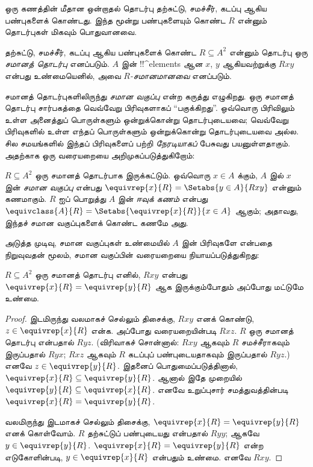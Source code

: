 \documentclass[../../../include/open-logic-section]{subfiles}
\begin{document}


ஒரு கணத்தின் மீதான ஒன்றாதல் தொடர்பு தற்சுட்டு, சமச்சீர், கடப்பு
ஆகிய பண்புகளைக் கொண்டது. இந்த மூன்று பண்புகளையும் கொண்ட
$R$ என்னும் தொடர்புகள் மிகவும் பொதுவானவை.

\begin{defn}[சமானத் தொடர்பு]
தற்சுட்டு, சமச்சீர், கடப்பு ஆகிய பண்புகளைக் கொண்ட
$R \subseteq A^2$ என்னும் தொடர்பு ஒரு \emph{சமானத் தொடர்பு} எனப்படும்.
$A$ இன் !!^{element}s ஆன $x$, $y$ ஆகியவற்றுக்கு $Rxy$
என்பது உண்மையெனில், அவை \emph{$R$-சமானமானவை} எனப்படும்.
\end{defn}

சமானத் தொடர்புகளிலிருந்து \emph{சமான வகுப்பு} என்ற கருத்து எழுகிறது.
ஒரு சமானத் தொடர்பு சார்பகத்தை வெவ்வேறு பிரிவுகளாகப் ``பகுக்கிறது''.
ஒவ்வொரு பிரிவிலும் உள்ள அனைத்துப் பொருள்களும் ஒன்றுக்கொன்று தொடர்புடையவை;
வெவ்வேறு பிரிவுகளில் உள்ள எந்தப் பொருள்களும் ஒன்றுக்கொன்று தொடர்புடையவை அல்ல.
சில சமயங்களில் இந்தப் பிரிவுகளைப் பற்றி \emph{நேரடியாகப்} பேசுவது பயனுள்ளதாகும்.
அதற்காக ஒரு வரையறையை அறிமுகப்படுத்துகிறோம்:

\begin{defn}
$R \subseteq A^2$ ஒரு சமானத் தொடர்பாக இருக்கட்டும்.
ஒவ்வொரு $x \in A$ க்கும், $A$ இல் $x$ இன் \emph{சமான வகுப்பு} என்பது
$\equivrep{x}{R} = \Setabs{y \in A}{Rxy}$ என்னும் கணமாகும்.
$R$ ஐப் பொறுத்து $A$ இன் \emph{ஈவுக் கணம்} என்பது
$\equivclass{A}{R} = \Setabs{\equivrep{x}{R}}{x \in A}$ ஆகும்;
அதாவது, இந்தச் சமான வகுப்புகளைக் கொண்ட கணமே அது.
\end{defn}

அடுத்த முடிவு, சமான வகுப்புகள் உண்மையில் $A$ இன் பிரிவுகளே என்பதை
நிறுவுவதன் மூலம், சமான வகுப்பின் வரையறையை நியாயப்படுத்துகிறது:

\begin{prop}
$R \subseteq A^2$ ஒரு சமானத் தொடர்பு எனில், $Rxy$ என்பது
$\equivrep{x}{R} = \equivrep{y}{R}$ ஆக இருக்கும்போதும்
அப்போது மட்டுமே உண்மை.
\end{prop}

\begin{proof}
இடமிருந்து வலமாகச் செல்லும் திசைக்கு, $Rxy$ எனக் கொண்டு,
$z \in \equivrep{x}{R}$ என்க. அப்போது வரையறையின்படி $Rxz$.
$R$ ஒரு சமானத் தொடர்பு என்பதால் $Ryz$.
(விரிவாகச் சொன்னால்: $Rxy$ ஆகவும் $R$ சமச்சீராகவும் இருப்பதால் $Ryx$;
$Rxz$ ஆகவும் $R$ கடப்புப் பண்புடையதாகவும் இருப்பதால் $Ryz$.)
எனவே $z \in \equivrep{y}{R}$. இதனைப் பொதுமைப்படுத்தினால்,
$\equivrep{x}{R} \subseteq \equivrep{y}{R}$.
ஆனால் இதே முறையில் $\equivrep{y}{R} \subseteq \equivrep{x}{R}$.
எனவே உறுப்புசார் சமத்துவத்தின்படி
$\equivrep{x}{R} = \equivrep{y}{R}$.

வலமிருந்து இடமாகச் செல்லும் திசைக்கு,
$\equivrep{x}{R} = \equivrep{y}{R}$ எனக் கொள்வோம்.
$R$ தற்சுட்டுப் பண்புடையது என்பதால் $Ryy$;
ஆகவே $y \in \equivrep{y}{R}$.
$\equivrep{x}{R} = \equivrep{y}{R}$ என்ற எடுகோளின்படி,
$y \in \equivrep{x}{R}$ என்பதும் உண்மை. எனவே $Rxy$.
\end{proof}
\end{document}
